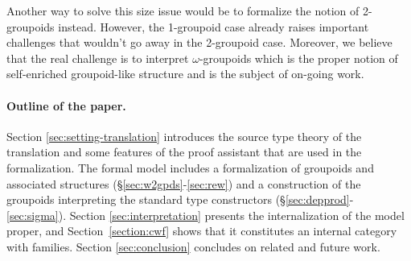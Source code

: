 Another way to solve this size issue would be to formalize the notion of
2-groupoids instead. However, the 1-groupoid case already raises
important challenges that wouldn't go away in the 2-groupoid case. 
Moreover, we believe that the real challenge is to interpret
$\omega$-groupoids which is the proper notion of self-enriched 
groupoid-like structure and is the subject of on-going work.




\paragraph{\bf Outline of the paper.}
Section \ref{sec:setting-translation} introduces the source type theory
of the translation and some features of the proof assistant that are
used in the formalization. The formal model includes a formalization of
groupoids and associated structures (\S\ref{sec:w2gpds}-\ref{sec:rew})
and a construction of the groupoids interpreting the standard type
constructors (\S\ref{sec:depprod}-\ref{sec:sigma}). Section
\ref{sec:interpretation} presents the internalization of the model
proper, and Section~\ref{section:cwf} shows that it constitutes
an internal category with families.
% 
 Section \ref{sec:conclusion} concludes on related and future work.
%

